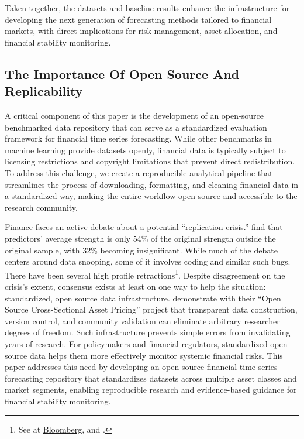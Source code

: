 \documentclass{article}
\begin{document}
Taken together, the datasets and baseline results enhance the infrastructure for developing the next generation of forecasting methods tailored to financial markets, with direct implications for risk management, asset allocation, and financial stability monitoring.



\subsection{The Importance Of Open Source And Replicability}

A critical component of this paper is the development of an open-source benchmarked data repository that can serve as a standardized evaluation framework for financial time series forecasting. While other benchmarks in machine learning provide datasets openly, financial data is typically subject to licensing restrictions and copyright limitations that prevent direct redistribution. To address this challenge, we create a reproducible analytical pipeline that streamlines the process of downloading, formatting, and cleaning financial data in a standardized way, making the entire workflow open source and accessible to the research community.

Finance faces an active debate about a potential ``replication crisis.'' \cite{Jensen2023} find that predictors' average strength is only 54\% of the original strength outside the original sample, with 32\% becoming insignificant. While much of the debate centers around data snooping, some of it involves
coding and similar such bugs. There have been several high profile retractions\footnote{See  \cite{Lee2023} at \href{https://www.bloomberg.com/news/articles/2023-12-01/a-grad-school-number-cruncher-shakes-up-the-world-of-bond-quants}{Bloomberg}, and \cite{Dickerson2024}.}.
Despite disagreement on the crisis's extent, consensus exists at least on one way to help the situation: standardized, open source data infrastructure. \cite{Chen2022} demonstrate with their ``Open Source Cross-Sectional Asset Pricing'' project that transparent data construction, version control, and community validation can eliminate arbitrary researcher degrees of freedom. Such infrastructure prevents simple errors from invalidating years of research. For policymakers and financial regulators, standardized open source data 
helps them more effectively monitor systemic financial risks. This paper addresses this need by developing an open-source financial time series forecasting repository that standardizes datasets across multiple asset classes and market segments, enabling reproducible research and evidence-based guidance for financial stability monitoring.
\end{document}
